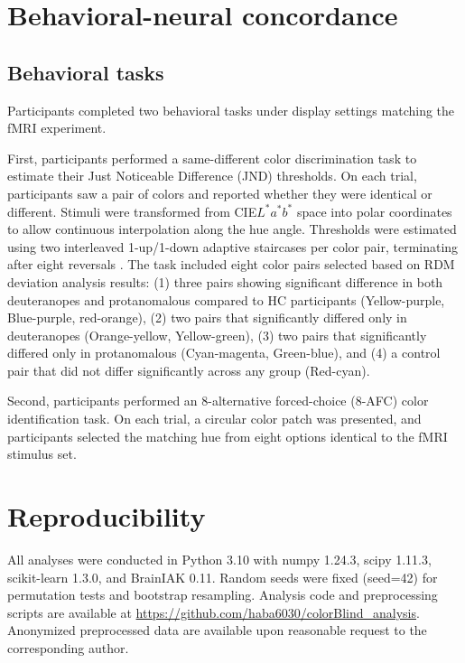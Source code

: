 \section{Behavioral-neural concordance}

\subsection*{Behavioral tasks}

Participants completed two behavioral tasks under display settings matching the fMRI experiment.

First, participants performed a same-different color discrimination task to estimate their Just Noticeable Difference (JND) thresholds. On each trial, participants saw a pair of colors and reported whether they were identical or different. Stimuli were transformed from CIE$L^*a^*b^*$ space into polar coordinates to allow continuous interpolation along the hue angle. Thresholds were estimated using two interleaved 1-up/1-down adaptive staircases per color pair, terminating after eight reversals \cite{levitt1971}. The task included eight color pairs selected based on RDM deviation analysis results: (1) three pairs showing significant difference in both deuteranopes and protanomalous compared to HC participants (Yellow-purple, Blue-purple, red-orange), (2) two pairs that significantly differed only in deuteranopes (Orange-yellow, Yellow-green), (3) two pairs that significantly differed only in protanomalous (Cyan-magenta, Green-blue), and (4) a control pair that did not differ significantly across any group (Red-cyan).

Second, participants performed an 8-alternative forced-choice (8-AFC) color identification task. On each trial, a circular color patch was presented, and participants selected the matching hue from eight options identical to the fMRI stimulus set.

\section{Reproducibility}

All analyses were conducted in Python 3.10 with numpy 1.24.3, scipy 1.11.3, scikit-learn 1.3.0, and BrainIAK 0.11. Random seeds were fixed (seed=42) for permutation tests and bootstrap resampling. Analysis code and preprocessing scripts are available at \url{https://github.com/haba6030/colorBlind_analysis}. Anonymized preprocessed data are available upon reasonable request to the corresponding author.
